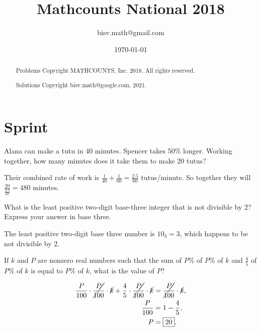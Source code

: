 \documentclass[11pt,twoside]{scrartcl}
\begin{document}
\title{Mathcounts National 2018}

\author{bisv.math@gmail.com}
\date{\today}

\maketitle

\begin{abstract}
    Problems Copyright MATHCOUNTS, Inc. 2018. All rights reserved. 
    
    Solutions Copyright bisv.math@google.com, 2021.
\end{abstract}

\newpage
\section{Sprint}
\begin{problem}
    Alana can make a tutu in 40 minutes. Spencer takes 50\% longer. Working
    together, how many minutes does it take them to make 20 tutus?
        \begin{sketch}
        Their combined rate of work is $\frac{1}{40} + \frac{1}{60} = \frac{2.5}{60}$ tutus/minute. So together they will $\frac{20}{\frac{2.5}{60}} = \boxed{480}$ minutes.
    \end{sketch}
\end{problem}

\begin{problem}
    What is the least positive two-digit base-three integer that is not divisible by 2? Express your answer in base three.
    \begin{sketch}
        The least positive two-digit base three number is $\boxed{10_3} = 3$, which happens to be not divisible by 2.
    \end{sketch}
\end{problem}

\begin{problem}
    If $ k $ and $ P $ are nonzero real numbers such that the sum of $ P\% $ of $ P\% $ of $ k $ and
$ \frac{4}{5} $ of $ P\% $ of $ k $ is equal to $ P\% $ of $ k $, what is the value of $ P $?
    \begin{sketch}
        \begin{align*}
            \frac{P}{100}\cdot\cancel{\frac{P}{100}}\cdot \cancel{k} + \frac{4}{5}\cdot\cancel{\frac{P}{100}}\cdot \cancel{k} &= \cancel{\frac{P}{100}}\cdot \cancel{k}, \\
            \frac{P}{100} &= 1 - \frac{4}{5}, \\
            P &= \boxed{20}.
        \end{align*}
    \end{sketch}
\end{problem}
\end{document}
